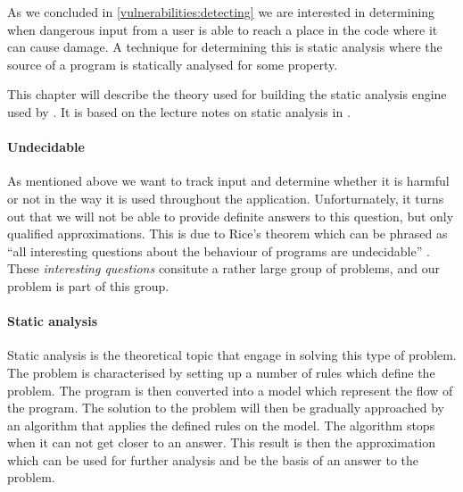 As we concluded in \cref{vulnerabilities:detecting}  we are interested in determining when dangerous input from a user is able to reach a place in the code where it can cause damage.
A technique for determining this is static analysis where the source of a program is statically analysed for some property.

This chapter will describe the theory used for building the static analysis engine used by \pyt{}.
It is based on the lecture notes on static analysis in \citet{schwartzbach}.

\paragraph{Undecidable}\label{theory_intro}
As mentioned above we want to track input and determine whether it is harmful or not in the way it is used throughout the application.
Unforturnately, it turns out that we will not be able to provide definite answers to this question, but only qualified approximations.
This is due to Rice's theorem which can be phrased as ``all interesting questions about the behaviour of programs are undecidable'' \citep[p.~3]{schwartzbach}.
These \emph{interesting questions} consitute a rather large group of problems, and our problem is part of this group.

\paragraph{Static analysis}
Static analysis is the theoretical topic that engage in solving this type of problem.
The problem is characterised by setting up a number of rules which define the problem.
The program is then converted into a model which represent the flow of the program.
The solution to the problem will then be gradually approached by an algorithm that applies the defined rules on the model.
The algorithm stops when it can not get closer to an answer.
This result is then the approximation which can be used for further analysis and be the basis of an answer to the problem.

